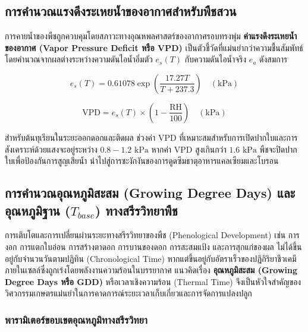 \subsection{การคำนวณแรงดึงระเหยน้ำของอากาศสำหรับพืชสวน}

การคายน้ำของพืชถูกควบคุมโดยสภาวะทางอุณหพลศาสตร์ของอากาศรอบทรงพุ่ม \textbf{ค่าแรงดึงระเหยน้ำของอากาศ (Vapor Pressure Deficit หรือ VPD)} เป็นตัวชี้วัดที่แม่นยำกว่าความชื้นสัมพัทธ์ โดยคำนวณจากผลต่างระหว่างความดันไอน้ำอิ่มตัว $e_s(T)$ กับความดันไอน้ำจริง $e_a$ ดังสมการ

\begin{equation}
e_s(T) = 0.61078 \exp\left( \frac{17.27 T}{T + 237.3} \right) \quad (\text{kPa})
\label{eq:tetens}
\end{equation}

\begin{equation}
\text{VPD} = e_s(T) \times \left( 1 - \frac{\text{RH}}{100} \right) \quad (\text{kPa})
\label{eq:vpd}
\end{equation}

สำหรับต้นทุเรียนในระยะออกดอกและติดผล ช่วงค่า VPD ที่เหมาะสมสำหรับการเปิดปากใบและการสังเคราะห์ด้วยแสงจะอยู่ระหว่าง $0.8 - 1.2\text{ kPa}$ หากค่า VPD สูงเกินกว่า $1.6\text{ kPa}$ พืชจะปิดปากใบเพื่อป้องกันการสูญเสียน้ำ นำไปสู่การชะงักงันของการดูดซึมธาตุอาหารแคลเซียมและโบรอน

\subsection{การคำนวณอุณหภูมิสะสม (Growing Degree Days) และอุณหภูมิฐาน ($T_{base}$) ทางสรีรวิทยาพืช}

การเติบโตและการเปลี่ยนผ่านระยะทางสรีรวิทยาของพืช (Phenological Development) เช่น การงอก การแตกใบอ่อน การสร้างตาดอก การบานของดอก การสะสมแป้ง และการสุกแก่ของผล ไม่ได้ขึ้นอยู่กับจำนวนวันตามปฏิทิน (Chronological Time) หากแต่ขึ้นอยู่กับอัตราเร็วของปฏิกิริยาชีวเคมีภายในเซลล์ซึ่งถูกเร่งโดยพลังงานความร้อนในบรรยากาศ แนวคิดเรื่อง \textbf{อุณหภูมิสะสม (Growing Degree Days หรือ GDD)} หรือเวลาเชิงความร้อน (Thermal Time) จึงเป็นหัวใจสำคัญของวิศวกรรมเกษตรแม่นยำในการคาดการณ์ระยะเวลาเก็บเกี่ยวและการจัดการแปลงปลูก

\subsubsection{พารามิเตอร์ขอบเขตอุณหภูมิทางสรีรวิทยา}

